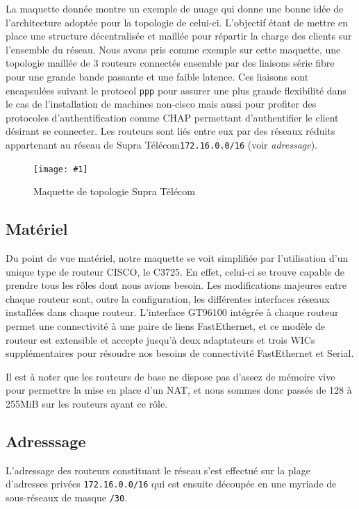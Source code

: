 \documentclass{article}
\newenvironment{figue}[1]{
	\par
	\bigskip
	\begin{figure}[h]
	\begin{center}
	  \texttt{[image: \#1]}
	\end{center}
}{
	\end{figure}
	\bigskip
}
\newcommand{\spr}{Supra Télécom\xspace}
\begin{document}
La maquette donnée montre un exemple de nuage qui donne une bonne idée de l'architecture adoptée pour la topologie de celui-ci.
L'objectif étant de mettre en place une structure décentralisée et maillée pour répartir la charge des clients sur l'ensemble du réseau.
Nous avons pris comme exemple sur cette maquette, une topologie maillée de 3 routeurs connectés ensemble par des liaisons série fibre pour une grande bande passante et une faible latence.
Ces liaisons sont encapsulées suivant le protocol \texttt{ppp} pour assurer une plus grande flexibilité dans le cas de l'installation de machines non-cisco mais aussi pour profiter des protocoles d'authentification comme CHAP permettant d'authentifier le client désirant se connecter.
Les routeurs sont liés entre eux par des réseaux réduits appartenant au réseau de \spr \texttt{172.16.0.0/16} (voir \emph{adressage}).

\begin{figue}{img/nuage-supra.pdf}
	\caption{Maquette de topologie \spr}
\end{figue}

\subsection{Matériel}

Du point de vue matériel, notre maquette se voit simplifiée par l'utilisation d'un unique type de routeur CISCO, le C3725.
En effet, celui-ci se trouve capable de prendre tous les rôles dont nous avions besoin.
Les modifications majeures entre chaque routeur sont, outre la configuration, les différentes interfaces réseaux installées dans chaque routeur.
L'interface GT96100 intégrée à chaque routeur permet une connectivité à une paire de liens FastEthernet, et ce modèle de routeur est extensible et accepte jusqu'à deux adaptateurs et trois WICs supplémentaires pour résoudre nos besoins de connectivité FastEthernet et Serial.

Il est à noter que les routeurs de base ne dispose pas d'assez de mémoire vive pour permettre la mise en place d'un NAT, et nous sommes donc passés de 128 à 255MiB sur les routeurs ayant ce rôle.

\subsection{Adresssage}
\label{adressage}

L'adressage des routeurs constituant le réseau s'est effectué sur la plage d'adresses privées \texttt{172.16.0.0/16} qui est ensuite découpée en une myriade de sous-réseaux de masque \texttt{/30}.
\end{document}
